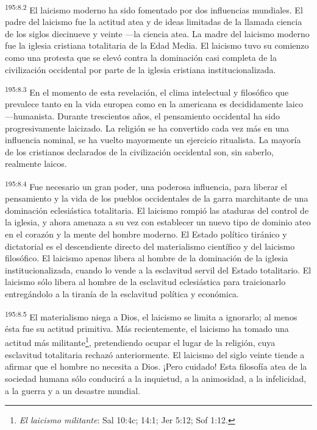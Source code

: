 \par
\textsuperscript{195:8.2} El laicismo moderno ha sido fomentado por dos influencias mundiales. El padre del laicismo fue la actitud atea y de ideas limitadas de la llamada ciencia de los siglos diecinueve y veinte ---la ciencia atea. La madre del laicismo moderno fue la iglesia cristiana totalitaria de la Edad Media. El laicismo tuvo su comienzo como una protesta que se elevó contra la dominación casi completa de la civilización occidental por parte de la iglesia cristiana institucionalizada.

\par
\textsuperscript{195:8.3} En el momento de esta revelación, el clima intelectual y filosófico que prevalece tanto en la vida europea como en la americana es decididamente laico ---humanista. Durante trescientos años, el pensamiento occidental ha sido progresivamente laicizado. La religión se ha convertido cada vez más en una influencia nominal, se ha vuelto mayormente un ejercicio ritualista. La mayoría de los cristianos declarados de la civilización occidental son, sin saberlo, realmente laicos.

\par
\textsuperscript{195:8.4} Fue necesario un gran poder, una poderosa influencia, para liberar el pensamiento y la vida de los pueblos occidentales de la garra marchitante de una dominación eclesiástica totalitaria. El laicismo rompió las ataduras del control de la iglesia, y ahora amenaza a su vez con establecer un nuevo tipo de dominio ateo en el corazón y la mente del hombre moderno. El Estado político tiránico y dictatorial es el descendiente directo del materialismo científico y del laicismo filosófico. El laicismo apenas libera al hombre de la dominación de la iglesia institucionalizada, cuando lo vende a la esclavitud servil del Estado totalitario. El laicismo sólo libera al hombre de la esclavitud eclesiástica para traicionarlo entregándolo a la tiranía de la esclavitud política y económica.

\par
\textsuperscript{195:8.5} El materialismo niega a Dios, el laicismo se limita a ignorarlo; al menos ésta fue su actitud primitiva. Más recientemente, el laicismo ha tomado una actitud más militante\footnote{\textit{El laicismo militante}: Sal 10:4c; 14:1; Jer 5:12; Sof 1:12.}, pretendiendo ocupar el lugar de la religión, cuya esclavitud totalitaria rechazó anteriormente. El laicismo del siglo veinte tiende a afirmar que el hombre no necesita a Dios. ¡Pero cuidado! Esta filosofía atea de la sociedad humana sólo conducirá a la inquietud, a la animosidad, a la infelicidad, a la guerra y a un desastre mundial.

